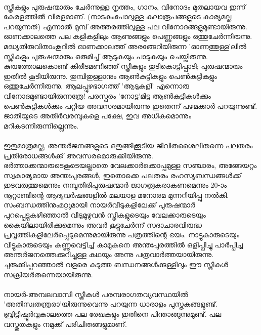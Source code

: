 \label{ch2box4} %
\begin{tcolorbox}[%
  breakable, %
  arc=0mm, 
  left=1pt, right = 1pt, 
  boxrule=0mm,
  colback = {blue!10}, %
] 

\paragraph{}സ്ത്രീകളും പുരുഷന്മാരും ചേർന്നുള്ള നൃത്തം, ഗാനം, വിനോദം മുതലായവ ഇന്ന് കേരളത്തിൽ വിരളമാണ്. (നാടകംപോലുള്ള കലാരൂപങ്ങളുടെ കാര്യമല്ല പറയുന്നത്) എന്നാൽ മുമ്പ് അത്തരത്തിലുള്ള പല വിനോദങ്ങളുമുണ്ടായിരുന്നു. ഓണക്കാലത്തെ പല കളികളിലും ആണുങ്ങളും പെണ്ണുങ്ങളും ഒത്തുചേർന്നിരുന്നു. മദ്ധ്യതിരുവിതാംകൂറിൽ ഓണക്കാലത്ത് അരങ്ങേറിയിരുന്ന 'ഓണത്തുള്ള'ലിൽ സ്ത്രീകളും പുരുഷന്മാരും ഒരുമിച്ച് ആടുകയും പാടുകയും ചെയ്തിരുന്നു. കുരുത്തോലകൊണ്ട് കിരീടമണിഞ്ഞ് സ്ത്രീകളും തുടികൊട്ടിപ്പാടി; പുരുഷന്മാരും ഇതിൽ കൂടിയിരുന്നു. തുമ്പിതുള്ളാനും ആൺകുട്ടികളും പെൺകുട്ടികളും ഒത്തുചേർന്നിരുന്നു. ആലപ്പുഴഭാഗത്ത് 'ആടുകളി' എന്നൊരു വിനോദമുണ്ടായിരുന്നത്രേ! പരസ്പരം 'നോട്ട'മിട്ട ആൺകുട്ടികൾക്കും പെൺകുട്ടികൾക്കും പറ്റിയ അവസരമായിരുന്നു ഇതെന്ന് പഴമക്കാർ പറയുന്നുണ്ട്. ജാതിയുടെ അതിർവരമ്പുകളെ പക്ഷേ, ഇവ അധികമൊന്നും മറികടന്നിരുന്നില്ലെന്നും.
\end{tcolorbox}

\paragraph{}ഇതുമാത്രമല്ല, അന്തർജനങ്ങളുടെ ഒതുങ്ങിക്കൂടിയ ജീവിതശൈലിതന്നെ പലതരം പ്രതിരോധങ്ങൾക്ക് അവസരമൊരുക്കിയിരുന്നു. ഭർത്താക്കന്മാരുടെകൂടെയല്ലാതെ വേലക്കാർക്കൊപ്പമുള്ള സഞ്ചാരം, അങ്ങേയറ്റം സ്വകാര്യമായ അന്തഃപുരങ്ങൾ, ഇതൊക്കെ പലതരം രഹസ്യബന്ധങ്ങൾക്ക് ഇടവരുത്തുമെന്നും നമ്പൂതിരിപുരുഷന്മാർ ജാഗരൂകരാകണമെന്നും 20-ാം നൂറ്റാണ്ടിന്റെ ആദ്യവർഷങ്ങളിൽ മലയാള മനോരമ മുന്നറിയിപ്പു നൽകി. സംബന്ധത്തിനുംമറ്റുമായി നായർവീടുകളിലേക്ക് പുരുഷന്മാർ പുറപ്പെട്ടുകഴിഞ്ഞാൽ വീടുമുഴുവൻ സ്ത്രീകളുടെയും വേലക്കാരുടെയും കൈയിലായിരിക്കുമെന്നും അവർ കൂട്ടുചേർന്ന് സദാചാരവിരുദ്ധ പ്രവൃത്തികളിലേർപ്പെടുമെന്നുമായിരുന്നു പത്രത്തിന്റെ ഭയം. നാട്ടുകാരുടെയും വീട്ടുകാരുടെയും കണ്ണുവെട്ടിച്ച് കാമുകനെ അന്തഃപുരത്തിൽ ഒളിപ്പിച്ചു പാർപ്പിച്ച അന്തർജനത്തെക്കുറിച്ചുള്ള കഥയും അന്നു പത്രവാർത്തയായിരുന്നു. ചുരുക്കിപ്പറഞ്ഞാൽ വളരെ കടുത്ത ബന്ധനങ്ങൾക്കുള്ളിലും ഈ സ്ത്രീകൾ സക്രിയർതന്നെയായിരുന്നു.

\paragraph{}നായർ-അമ്പലവാസി സ്ത്രീകൾ പരമ്പരാഗതവ്യവസ്ഥയിൽ 'അതിസ്വതന്ത്രരാ'യിരുന്നുവെന്നു പറയുന്ന ധാരാളം പുസ്തകങ്ങളുണ്ട്. ബ്രിട്ടിഷ്പൂർവ്വകാലത്തെ പല രേഖകളും ഇതിനെ പിന്താങ്ങുന്നുമുണ്ട്. പല വസ്തുതകളും നമുക്ക് പരിചിതങ്ങളുമാണ്.

